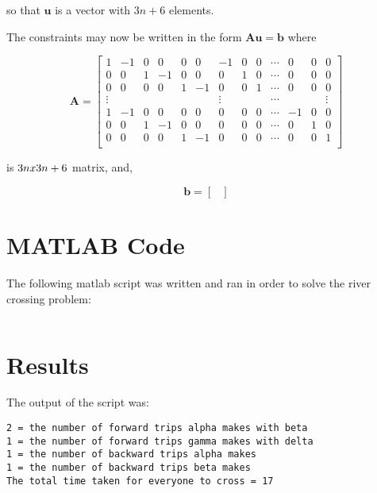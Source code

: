 \documentclass{article}
\begin{document}
\noindent so that $\mathbf{u}$ is a vector with $3n + 6$ elements.

The constraints may now be written in the form $\mathbf{A} \mathbf{u} = \mathbf{b}$ where

\begin{equation}
\mathbf{A} = \left[ \begin{smallmatrix}
1 & -1 & 0 & 0 & 0 & 0 & -1 & 0 & 0 & \cdots & 0 & 0 & 0\\
0 & 0 & 1 & -1 & 0 & 0 & 0 & 1 & 0 & \cdots & 0 & 0 & 0\\
0 & 0 & 0 & 0 & 1 & -1 & 0 & 0 & 1 & \cdots & 0 & 0 & 0\\
\vdots & & & & & & \vdots & & & \cdots & & & \vdots\\
1 & -1 & 0 & 0 & 0 & 0 & 0 & 0 & 0 & \cdots & -1 & 0 & 0\\
0 & 0 & 1 & -1 & 0 & 0 & 0 & 0 & 0 & \cdots & 0 & 1 & 0\\
0 & 0 & 0 & 0 & 1 & -1 & 0 & 0 & 0 & \cdots & 0 & 0 & 1\\
\end{smallmatrix} \right]
\end{equation}

\noindent is $3n \mathnormal{x} 3n+6$ matrix, and,

\begin{equation}
\mathbf{b} = \begin{bmatrix}

\end{bmatrix}
\end{equation}

\section{MATLAB Code}

The following matlab script was written and ran in order to solve the river crossing problem:

\begin{lstlisting}
\end{lstlisting}

\section{Results}

The output of the script was:

\begin{verbatim}
2 = the number of forward trips alpha makes with beta
1 = the number of forward trips gamma makes with delta
1 = the number of backward trips alpha makes
1 = the number of backward trips beta makes
The total time taken for everyone to cross = 17
\end{verbatim}
\end{document}
